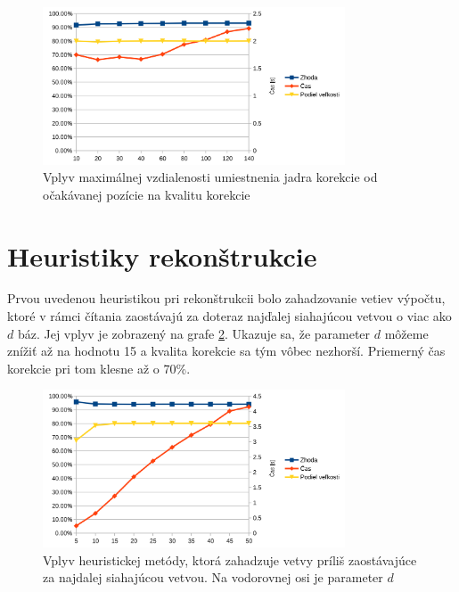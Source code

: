\begin{figure}
    \centering
    \includegraphics[width=0.8\textwidth]{images/max_node_misplacement.png}
    \caption{Vplyv maximálnej vzdialenosti umiestnenia jadra korekcie od očakávanej pozície na kvalitu korekcie}
    \label{fig:max_node_misplacement}
\end{figure} 

\section{Heuristiky rekonštrukcie}

Prvou uvedenou heuristikou pri rekonštrukcii bolo zahadzovanie vetiev výpočtu, ktoré v rámci čítania zaostávajú za doteraz najďalej siahajúcou vetvou o viac ako $d$ báz. Jej vplyv je zobrazený na grafe \ref{fig:max_distance_from_furthest_reaching}. Ukazuje sa, že parameter $d$ môžeme znížiť až na hodnotu 15 a kvalita korekcie sa tým vôbec nezhorší. Priemerný čas korekcie pri tom klesne až o 70\%.

\begin{figure}
    \centering
    \includegraphics[width=0.8\textwidth]{images/max_distance_from_furthest_reaching.png}
    \caption{Vplyv heuristickej metódy, ktorá zahadzuje vetvy príliš zaostávajúce za najdalej siahajúcou vetvou. Na vodorovnej osi je parameter $d$}
    \label{fig:max_distance_from_furthest_reaching}
\end{figure} 

